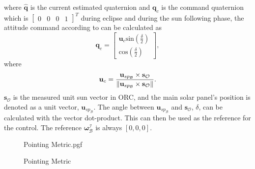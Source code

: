 where $\hat{\mathbf{q}}$ is the current estimated quaternion and $\mathbf{q}_{c}$ is the command quaternion which is $\begin{bmatrix}
	0 & 0 & 0& 1
\end{bmatrix}^T$ during eclipse and during the sun following phase, the attitude command according to \cite{chen2000ground} can be calculated as 
\begin{equation}
	\mathbf{q}_c = \begin{bmatrix}
		\mathbf{u}_c \text{sin}(\frac{\delta}{2}) \\
		\text{cos}(\frac{\delta}{2})
	\end{bmatrix},
\end{equation}
where 
\begin{equation}
	\mathbf{u}_c = \frac{\mathbf{u}_{sp_\mathcal{B}} \times \mathbf{s}_\mathcal{O}}{\left\lVert\mathbf{u}_{sp_\mathcal{B}} \times \mathbf{s}_\mathcal{O}\right\rVert}.
\end{equation}
$\mathbf{s}_\mathcal{O}$ is the measured unit sun vector in ORC, and the main solar panel's position is denoted as a unit vector, $\mathbf{u}_{sp_\mathcal{B}}$. The angle between $\mathbf{u}_{sp_\mathcal{B}}$ and $\mathbf{s}_\mathcal{O}$, $\delta$, can be calculated with the vector dot-product. This can then be used as the reference for the control. The reference $\boldsymbol{\omega}_{\mathcal{B}}^{\mathcal{I}}$ is always $[0, 0, 0]$. 

\begin{figure}[!htb]  
	\centering
	\def\pgfwidth{10cm}
	{Pointing Metric.pgf}
	
	\caption{Pointing Metric}
	\label{fig:Pointing Metric}
\end{figure}

